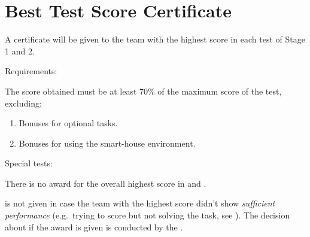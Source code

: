 \section{Best Test Score Certificate}\label{sec:best_score_certificate}
A certificate will be given to the team with the highest score in each test of Stage 1 and 2. 

\begin{enumerate}
	{\bf\item Requirements:} The score obtained must be at least 70\% of the maximum score of the test, excluding:
	\begin{enumerate}
		\item Bonuses for optional tasks.
		\item Bonuses for using the smart-house environment.
	\end{enumerate}
	{\bf\item Special tests:} There is no award for the overall highest score in  and .
\end{enumerate}

 is not given in case the team with the highest score didn't show \emph{sufficient performance} (e.g.~trying to score but not solving the task, see ). The decision about if the award is given is conducted by the .
